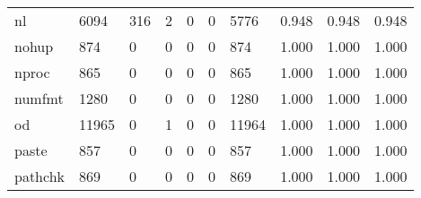\begin{longtable}{lp{2.0cm}p{2.0cm}p{2.0cm}p{2.0cm}p{2.0cm}p{2.0cm}p{2.0cm}p{2.0cm}p{2.0cm}}
nl        &                   6094 &                                316 &                                 2 &                                0 &                                 0 &                            5776 &                                   0.948 &                                  0.948 &                                0.948 \\
nohup     &                    874 &                                  0 &                                 0 &                                0 &                                 0 &                             874 &                                   1.000 &                                  1.000 &                                1.000 \\
nproc     &                    865 &                                  0 &                                 0 &                                0 &                                 0 &                             865 &                                   1.000 &                                  1.000 &                                1.000 \\
numfmt    &                   1280 &                                  0 &                                 0 &                                0 &                                 0 &                            1280 &                                   1.000 &                                  1.000 &                                1.000 \\
od        &                  11965 &                                  0 &                                 1 &                                0 &                                 0 &                           11964 &                                   1.000 &                                  1.000 &                                1.000 \\
paste     &                    857 &                                  0 &                                 0 &                                0 &                                 0 &                             857 &                                   1.000 &                                  1.000 &                                1.000 \\
pathchk   &                    869 &                                  0 &                                 0 &                                0 &                                 0 &                             869 &                                   1.000 &                                  1.000 &                                1.000 \\

\end{longtable}
